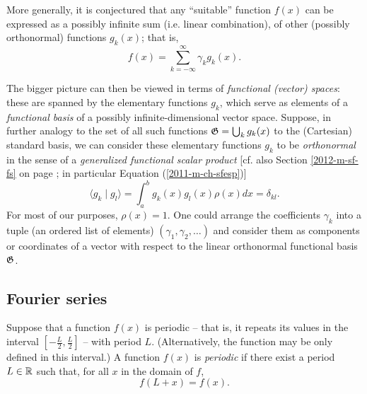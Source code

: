 More generally, it is conjectured that any ``suitable''
function $f(x)$
can be expressed as a  possibly infinite  sum (i.e. linear combination), of other (possibly orthonormal) functions $g_k( x)$; that is,
\begin{equation}
f(x)= \sum_{k=-\infty}^\infty
\gamma_k g_k(x).
\label{2012-m-ch-fourier_conjecturegen}
\end{equation}

The bigger picture can then be viewed in terms of
{\em functional (vector) spaces}: these are spanned by the elementary functions $g_k$, which serve as elements of a
{\em functional basis} of a possibly infinite-dimensional vector space.
Suppose, in further analogy to the set of all such functions ${\frak G}=\bigcup_k g_k(x)$
to the (Cartesian) standard basis, we can consider these elementary functions $g_k$ to be
{\em orthonormal} in the sense of a {\em generalized functional scalar product}
 [cf. also Section \ref{2012-m-sf-fs} on page \pageref{2012-m-sf-fs}; in particular
Equation (\ref{2011-m-ch-sfesp})]
\begin{equation}
\langle   g_k \mid g_l\rangle
=
\int_{a}^b g_k(x)g_l(x)  \rho(x) dx =\delta_{kl}.
\label{2012-m-ch-sfesp1}
\end{equation}
For most of our purposes, $\rho (x)=1$.
One could arrange the coefficients $\gamma_k$ into a tuple (an ordered list of elements)
$(\gamma_1,\gamma_2, \ldots)$
and consider them as components or coordinates of a vector with respect to the
linear orthonormal functional basis ${\frak G}$.



\subsection{Fourier series}

Suppose that a function $f(x)$ is periodic -- that is, it repeats  its values in the interval $[-\frac{L}{2},\frac{L}{2}]$ --  with period $L$.
(Alternatively, the function may be only defined in this interval.)
A function $f(x)$
is {\em periodic}
if there exist a period $L\in {\Bbb R}$ such that, for all $x$ in the domain of $f$,
\begin{equation}
f(L+x)=f(x).
\end{equation}


